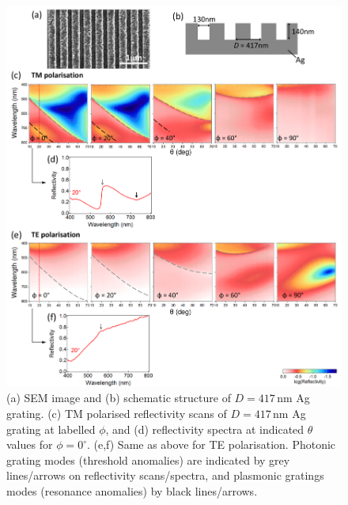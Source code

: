 \begin{figure}[h!] 
\centering    
\includegraphics[width=\textwidth]{Fig8}
\caption[(a) SEM image and (b) schematic structure of $D=417$\,nm Ag grating. Reflectivity measurements of Ag grating in (c,d) TM and (e.f) TE polarisation.]{(a) SEM image and (b) schematic structure of $D=417$\,nm Ag grating. (c) TM polarised reflectivity scans of $D=417$\,nm Ag grating at labelled $\phi$, and (d) reflectivity spectra at indicated $\theta$ values for $\phi=0^{\circ}$. (e,f) Same as above for TE polarisation. Photonic grating modes (threshold anomalies) are indicated by grey lines/arrows on reflectivity scans/spectra, and plasmonic gratings modes (resonance anomalies) by black lines/arrows.}
\label{7Fig8}
\end{figure}

